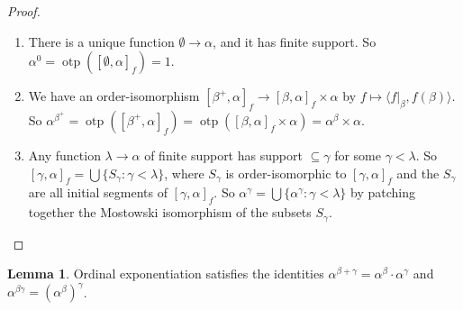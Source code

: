 \documentclass[a4paper]{article}
\theoremstyle{definition}
\newtheorem*{lemma}{Lemma}
\newcommand{\bra}{\langle}
\newcommand{\ket}{\rangle}
\DeclareMathOperator\otp{otp}
\begin{document}
\begin{proof}\leavevmode
  \begin{enumerate}
  \item There is a unique function $\emptyset\to\alpha$, and it has finite support. So $\alpha^0 = \otp([\emptyset, \alpha]_f) = 1$.
  \item We have an order-isomorphism $[\beta^+, \alpha]_f \to [\beta,\alpha]_f\times \alpha$ by $f\mapsto \bra f|_\beta, f(\beta)\ket$. So $\alpha^{\beta^+} = \otp([\beta^+, \alpha]_f) = \otp([\beta, \alpha]_f\times\alpha) = \alpha^\beta\times \alpha$.
  \item Any function $\lambda\to\alpha$ of finite support has support $\subseteq \gamma$ for some $\gamma < \lambda$. So $[\gamma,\alpha]_f = \bigcup\{S_\gamma: \gamma < \lambda\}$, where $S_\gamma$ is order-isomorphic to $[\gamma, \alpha]_f$ and the $S_\gamma$ are all initial segments of $[\gamma, \alpha]_f$. So $\alpha^\gamma = \bigcup \{\alpha^\gamma: \gamma < \lambda\}$ by patching together the Mostowski isomorphism of the subsets $S_\gamma$. 
  \end{enumerate}
\end{proof}

\begin{lemma}
  Ordinal exponentiation satisfies the identities $\alpha^{\beta + \gamma} = \alpha^\beta \cdot \alpha^\gamma$ and $\alpha^{\beta\gamma} = (\alpha^\beta)^\gamma$.
\end{lemma}
\end{document}
